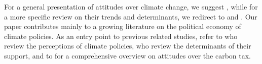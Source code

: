 \documentclass[english,5p,authoryear]{elsarticle}
\begin{document}

For a general presentation of attitudes over climate change, we suggest \citet{whitmarsh_2_2018}, while for a more specific review on their trends and determinants, we redirect to \citet{brechin_public_2010} and \citet{ziegler_political_2017}. Our paper contributes mainly to a growing literature on the political economy of climate policies. As an entry point to previous related studies, refer to \citet{maestre-andres_perceived_2019} who review the perceptions of climate policies, \citet{drews_van_der_bergh_2016} who review the determinants of their support, and to \citet{carattini_overcoming_2018} for a comprehensive overview on attitudes over the carbon tax. 
\end{document}
